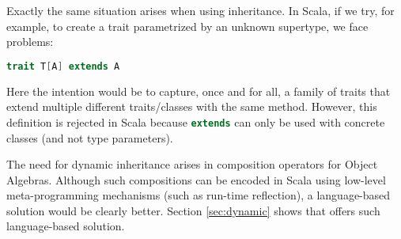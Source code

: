 Exactly the same situation arises when using inheritance. In Scala, if
we try, for example, to create a trait parametrized by an unknown
supertype, we face problems:

\begin{lstlisting}[language=scala]
trait T[A] extends A
\end{lstlisting}

\noindent Here the intention would be to capture, once and for all, a 
family of traits that extend multiple different traits/classes with
the same method. However, this definition is rejected in Scala because 
\lstinline[language=scala]{extends} can only be used with concrete classes (and not
type parameters).  
 

The need for dynamic inheritance arises in composition operators for Object
Algebras. Although such compositions can be encoded in Scala using low-level
meta-programming mechanisms (such as run-time reflection), a language-based
solution would be clearly better. Section \ref{sec:dynamic} shows that \name
offers such language-based solution.
